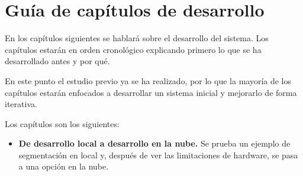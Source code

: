 \chapter{Gu\'ia de cap\'itulos de desarrollo}\label{guiacapitulos}

En los capítulos siguientes se hablará sobre el desarrollo del sistema. Los capítulos estarán en orden cronológico explicando primero lo que se ha desarrollado antes y por qué.

En este punto el estudio previo ya se ha realizado, por lo que la mayoría de los capítulos estarán enfocados a desarrollar un sistema inicial y mejorarlo de forma iterativa. 

Los capítulos son los siguientes:

\begin{itemize}
\item \textbf{De desarrollo local a desarrollo en la nube.} Se prueba un ejemplo de segmentación en local y, después de ver las limitaciones de hardware, se pasa a una opción en la nube.
\end{itemize}